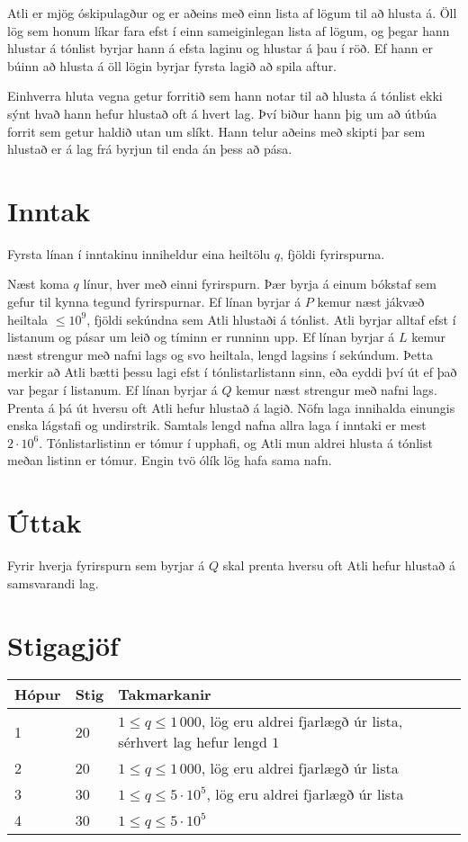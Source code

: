 
Atli er mjög óskipulagður og er aðeins með einn lista af lögum til að hlusta
á. Öll lög sem honum líkar fara efst í einn sameiginlegan lista af lögum, og
þegar hann hlustar á tónlist byrjar hann á efsta laginu og hlustar á þau í
röð. Ef hann er búinn að hlusta á öll lögin byrjar fyrsta lagið að spila aftur.

Einhverra hluta vegna getur forritið sem hann notar til að hlusta á tónlist
ekki sýnt hvað hann hefur hlustað oft á hvert lag. Því biður hann þig um að
útbúa forrit sem getur haldið utan um slíkt. Hann telur aðeins með skipti
þar sem hlustað er á lag frá byrjun til enda án þess að pása. 

\section*{Inntak}
Fyrsta línan í inntakinu inniheldur eina heiltölu $q$, fjöldi fyrirspurna.

Næst koma $q$ línur, hver með einni fyrirspurn. Þær byrja á einum bókstaf sem gefur
til kynna tegund fyrirspurnar. Ef línan byrjar á $P$ kemur næst jákvæð heiltala $\leq 10^9$, 
fjöldi sekúndna sem Atli hlustaði á tónlist. Atli byrjar alltaf efst í listanum og pásar um leið og tíminn er runninn upp.
Ef línan byrjar á $L$ kemur næst strengur með
nafni lags og svo heiltala, lengd lagsins í sekúndum. Þetta merkir að Atli bætti þessu lagi efst í tónlistarlistann
sinn, eða eyddi því út ef það var þegar í listanum. Ef línan byrjar á $Q$ kemur næst
strengur með nafni lags. Prenta á þá út hversu oft Atli hefur hlustað á lagið. 
Nöfn laga innihalda einungis enska lágstafi og undirstrik. Samtals lengd nafna allra
laga í inntaki er mest $2 \cdot 10^6$.
Tónlistarlistinn er tómur í upphafi, og Atli mun aldrei hlusta á tónlist meðan listinn er tómur. Engin tvö
ólík lög hafa sama nafn.

\section*{Úttak}
Fyrir hverja fyrirspurn sem byrjar á $Q$ skal prenta hversu oft Atli hefur hlustað á
samsvarandi lag.

\section*{Stigagjöf}
\begin{tabular}{|l|l|l|}
\hline
Hópur & Stig & Takmarkanir \\ \hline
1     & 20   & $1 \leq q \leq 1\,000$, lög eru aldrei fjarlægð úr lista, sérhvert lag hefur lengd $1$ \\ \hline
2     & 20   & $1 \leq q \leq 1\,000$, lög eru aldrei fjarlægð úr lista \\ \hline
3     & 30   & $1 \leq q \leq 5 \cdot 10^5$, lög eru aldrei fjarlægð úr lista \\ \hline
4     & 30   & $1 \leq q \leq 5 \cdot 10^5$ \\ \hline
\end{tabular}

